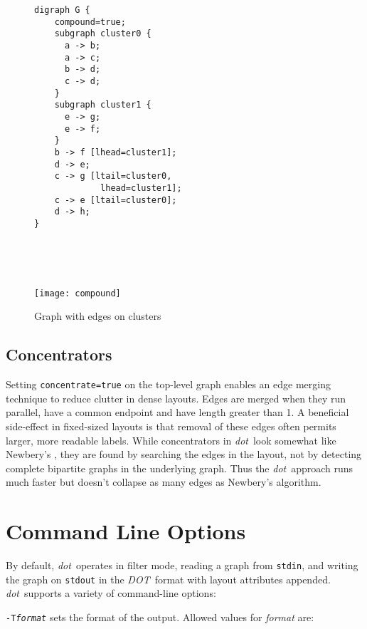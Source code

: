 \documentclass[11pt]{article}
\def\dot{{\it dot}}
\def\DOT{{\it DOT}}
\begin{document}
{\begin{figure}[p]
\begin{minipage}[t]{2.25in}
\begin{verbatim}
digraph G {
    compound=true;
    subgraph cluster0 {
      a -> b;
      a -> c;
      b -> d;
      c -> d;
    }
    subgraph cluster1 {
      e -> g;
      e -> f;
    }
    b -> f [lhead=cluster1];
    d -> e;
    c -> g [ltail=cluster0,
             lhead=cluster1];
    c -> e [ltail=cluster0];
    d -> h;
}
\end{verbatim}
\end{minipage} \hspace{0.5in} \
\parbox[t]{2.0in}{
    \ \\
	\centerline {
		\texttt{[image: compound]}
	}
}
    \caption{Graph with edges on clusters}
    \label{fig:compound}
\end{figure}

\subsection{Concentrators}
Setting \verb"concentrate=true" on the top-level graph enables 
an edge merging technique to reduce clutter in dense layouts.
Edges are merged when they run parallel, have a common endpoint
and have length greater than 1.
A beneficial side-effect in fixed-sized layouts is that removal
of these edges often permits larger, more readable labels.
While concentrators in \dot\ look somewhat like Newbery's
\cite{newbery:concentrators}, they are found by searching
the edges in the layout, not by detecting complete bipartite graphs in
the underlying graph.  Thus the \dot\ approach runs much faster
but doesn't collapse as many edges as Newbery's algorithm.

\section{Command Line Options}

By default, \dot\ operates in filter mode,
reading a graph from {\tt stdin}, and
writing the graph on {\tt stdout} in the \DOT\ format with 
layout attributes appended.
\dot\ supports a variety of command-line options:

{\tt-T{\it format}} sets the format of the output. Allowed values
for {\it format} are:

}
\end{document}
